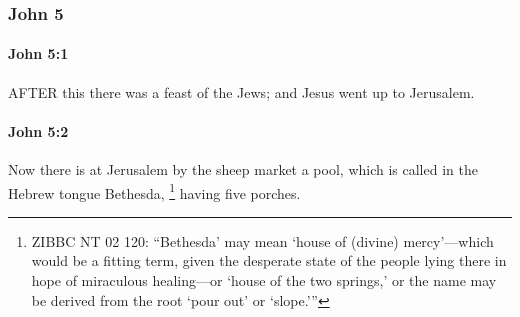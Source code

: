 	\subsubsection{John 5} %
		\label{JOHN-5}
		
		\paragraph{John 5:1} %
			\label{JOHN-5-1}

			AFTER this there was a feast of the Jews; and Jesus went up to Jerusalem.

			\begin{framed}
			\scriptsize
				\begin{compactdesc}
					\item[SBLG] 
				\end{compactdesc}
			\end{framed}

		\paragraph{John 5:2} %
			\label{JOHN-5-2}

			Now there is at Jerusalem by the sheep market a pool, which is called in the Hebrew tongue Bethesda,%
				\footnote{%
					ZIBBC NT 02 120: ``Bethesda' may mean `house of (divine) mercy'---which would be a fitting term, given the desperate state of the people lying there in hope of miraculous healing---or `house of the two springs,' or the name may be derived from the root `pour out' or `slope.'''
					}
			having five porches.

